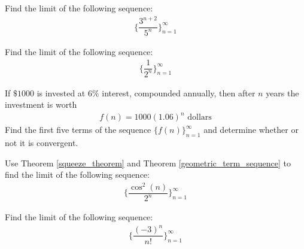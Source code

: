 \begin{exercise}
Find the limit of the following sequence:
\begin{align*}
    \Big\{\dfrac{3^{n+2}}{5^{n}}\Big\}_{n=1}^{\infty}
\end{align*}
\end{exercise}

\begin{exercise}
Find the limit of the following sequence:
\begin{align*}
    \Big\{\dfrac{1}{2^{n}}\Big\}_{n=1}^{\infty}
\end{align*}
\end{exercise}

\begin{exercise}
If $\$1000$ is invested at $6\%$ interest, compounded annually, then after $n$ years the investment is worth
\begin{align*}
    f(n) = 1000(1.06)^{n} \hspace{4pt} \text{dollars}
\end{align*}
Find the first five terms of the sequence $\{f(n)\}_{n=1}^{\infty}$ and determine whether or not it is convergent.
\end{exercise}

\begin{exercise}
Use Theorem \ref{squeeze_theorem} and Theorem \ref{geometric_term_sequence} to find the limit of the following sequence:
\begin{align*}
    \Big\{\dfrac{\cos^{2}(n)}{2^{n}}\Big\}_{n=1}^{\infty}
\end{align*}
\end{exercise}

\begin{exercise}
Find the limit of the following sequence:
\begin{align*}
    \Big\{\dfrac{(-3)^{n}}{n!}\Big\}_{n=1}^{\infty}
\end{align*}
\end{exercise}


